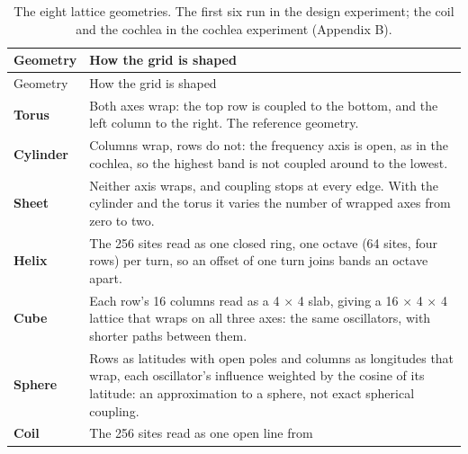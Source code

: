 \documentclass[10pt]{article}
\begin{document}
\begin{longtable}[]{@{}
  >{\raggedright\arraybackslash}p{}
  >{\raggedright\arraybackslash}p{}@{}}
\caption{The eight lattice geometries. The first six run in the design
experiment; the coil and the cochlea in the cochlea experiment (Appendix
B).}\tabularnewline
\toprule\noalign{}
\begin{minipage}[b]{\linewidth}\raggedright
Geometry
\end{minipage} & \begin{minipage}[b]{\linewidth}\raggedright
How the grid is shaped
\end{minipage} \\
\midrule\noalign{}
\endfirsthead
\toprule\noalign{}
\begin{minipage}[b]{\linewidth}\raggedright
Geometry
\end{minipage} & \begin{minipage}[b]{\linewidth}\raggedright
How the grid is shaped
\end{minipage} \\
\midrule\noalign{}
\endhead
\bottomrule\noalign{}
\endlastfoot
\textbf{Torus} & Both axes wrap: the top row is coupled to the bottom,
and the left column to the right. The reference geometry. \\
\cmidrule{1-2}\textbf{Cylinder} & Columns wrap, rows do not: the
frequency axis is open, as in the cochlea, so the highest band is not
coupled around to the lowest. \\
\cmidrule{1-2}\textbf{Sheet} & Neither axis wraps, and coupling stops at
every edge. With the cylinder and the torus it varies the number of
wrapped axes from zero to two. \\
\cmidrule{1-2}\textbf{Helix} & The 256 sites read as one closed ring,
one octave (64 sites, four rows) per turn, so an offset of one turn
joins bands an octave apart. \\
\cmidrule{1-2}\textbf{Cube} & Each row's 16 columns read as a 4
\ensuremath{\times} 4 slab, giving a 16 \ensuremath{\times} 4
\ensuremath{\times} 4 lattice that wraps on all three axes: the same
oscillators, with shorter paths between them. \\
\cmidrule{1-2}\textbf{Sphere} & Rows as latitudes with open poles and
columns as longitudes that wrap, each oscillator's influence weighted by
the cosine of its latitude: an approximation to a sphere, not exact
spherical coupling. \\
\cmidrule{1-2}\textbf{Coil} & The 256 sites read as one open line from

\end{longtable}
\end{document}
